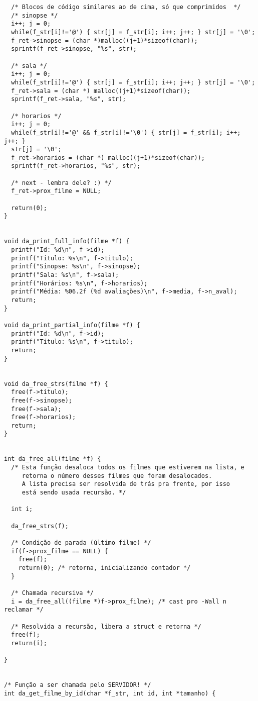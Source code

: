 \documentclass[11pt,twoside]{article}
\begin{document}
\begin{verbatim}
  /* Blocos de código similares ao de cima, só que comprimidos  */
  /* sinopse */
  i++; j = 0;
  while(f_str[i]!='@') { str[j] = f_str[i]; i++; j++; } str[j] = '\0';
  f_ret->sinopse = (char *)malloc((j+1)*sizeof(char));
  sprintf(f_ret->sinopse, "%s", str);

  /* sala */
  i++; j = 0;
  while(f_str[i]!='@') { str[j] = f_str[i]; i++; j++; } str[j] = '\0';
  f_ret->sala = (char *) malloc((j+1)*sizeof(char));
  sprintf(f_ret->sala, "%s", str);

  /* horarios */
  i++; j = 0;
  while(f_str[i]!='@' && f_str[i]!='\0') { str[j] = f_str[i]; i++; j++; }
  str[j] = '\0';
  f_ret->horarios = (char *) malloc((j+1)*sizeof(char));
  sprintf(f_ret->horarios, "%s", str);

  /* next - lembra dele? :) */
  f_ret->prox_filme = NULL;

  return(0);
}


void da_print_full_info(filme *f) {
  printf("Id: %d\n", f->id);
  printf("Titulo: %s\n", f->titulo);
  printf("Sinopse: %s\n", f->sinopse);
  printf("Sala: %s\n", f->sala);
  printf("Horários: %s\n", f->horarios);
  printf("Média: %06.2f (%d avaliações)\n", f->media, f->n_aval);
  return;
}

void da_print_partial_info(filme *f) {
  printf("Id: %d\n", f->id);
  printf("Titulo: %s\n", f->titulo);
  return;
}


void da_free_strs(filme *f) {
  free(f->titulo);
  free(f->sinopse);
  free(f->sala);
  free(f->horarios);
  return;
}


int da_free_all(filme *f) {
  /* Esta função desaloca todos os filmes que estiverem na lista, e
     retorna o número desses filmes que foram desalocados.
     A lista precisa ser resolvida de trás pra frente, por isso 
     está sendo usada recursão. */

  int i;

  da_free_strs(f);

  /* Condição de parada (último filme) */
  if(f->prox_filme == NULL) {
    free(f);
    return(0); /* retorna, inicializando contador */
  }

  /* Chamada recursiva */
  i = da_free_all((filme *)f->prox_filme); /* cast pro -Wall n reclamar */

  /* Resolvida a recursão, libera a struct e retorna */
  free(f);
  return(i);

}
	

/* Função a ser chamada pelo SERVIDOR! */
int da_get_filme_by_id(char *f_str, int id, int *tamanho) {


\end{verbatim}
\end{document}

